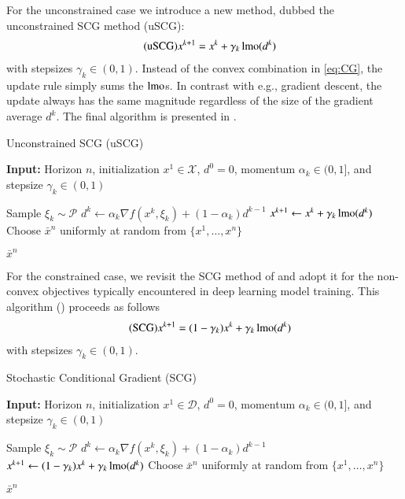 For the unconstrained case we introduce a new method, dubbed the unconstrained SCG method (uSCG): 
\begin{equation*}\label{eq:uSCG}
\tag{uSCG}
\begin{split}
x^{k+1} &= x^k + \gamma_k \operatorname{lmo}(d^k)
\end{split}
\end{equation*}
with stepsizes $\gamma_k \in (0,1)$. 
Instead of the convex combination in \ref{eq:CG}, the update rule simply sums the $\operatorname{lmo}$s.
In contrast with e.g., gradient descent, the update  always has the same magnitude regardless of the size of the gradient average $d^k$.
The final algorithm is presented in .


\begin{algorithm}[t]
\caption{Unconstrained SCG (uSCG)}
\label{alg:uSCG}
\textbf{Input:} Horizon $n$, initialization $x^1 \in \mathcal X$, $d^0 = 0$, momentum $\alpha_k \in (0,1]$, and stepsize $\gamma_k \in (0,1)$
\begin{algorithmic}[1]
        \State Sample $\xi_{k}\sim \mathcal P$
        \State $d^{k} \gets \alpha_{k} \nabla f(x^{k}, \xi_{k}) + (1 - \alpha_{k})d^{k-1}$
        \State $x^{k+1} \gets x^k + \gamma_k \operatorname{lmo}(d^k)$
    \EndFor
    \State Choose $\bar{x}^n$ uniformly at random from $\{x^1, \dots, x^n\}$
    \item[\algfont{Return}] $\bar{x}^n$
\end{algorithmic}
\end{algorithm}

For the constrained case, we revisit the SCG method of \citet{mokhtari2020stochastic} and adopt it for the non-convex objectives typically encountered in deep learning model training.
This algorithm  () proceeds as follows
\begin{equation}\label{eq:SCG}
\tag{SCG}
\begin{split}
x^{k+1} &= (1-\gamma_k) x^k + \gamma_k \operatorname{lmo}(d^k)
\end{split}
\end{equation}
with stepsizes $\gamma_k \in (0,1)$. %


\begin{algorithm}
\caption{Stochastic Conditional Gradient (SCG)}
\label{alg:SCG}
\textbf{Input:} Horizon $n$, initialization $x^1 \in \mathcal D$, $d^0 = 0$, momentum $\alpha_k\in (0,1]$, and stepsize $\gamma_k \in (0,1)$
\begin{algorithmic}[1]
        \State Sample $\xi_{k}\sim \mathcal P$
        \State $d^{k} \gets \alpha_{k} \nabla f(x^{k}, \xi_{k}) + (1 - \alpha_{k})d^{k-1}$
        \State $x^{k+1} \gets (1-\gamma_k) x^k + \gamma_k \operatorname{lmo}(d^k)$
    \EndFor
    \State Choose $\bar{x}^n$ uniformly at random from $\{x^1, \dots, x^n\}$
    \item[\algfont{Return}] $\bar{x}^n$
\end{algorithmic}
\end{algorithm}

